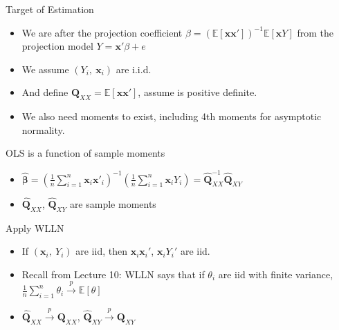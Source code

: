\documentclass[aspectratio=169, handout, t]{beamer}
\numberwithin{equation}{section}
\begin{document}

\begin{frame}{Target of Estimation}
\begin{itemize}
\item We are after the projection coefficient $\beta=(\mathbb{E}[\bm{x}\bm{x}'])^{-1}\mathbb{E}[\bm{x}Y]$ from the projection model $Y=\bm{x}'\beta+e$
\item We assume $(Y_i,\ \bm{x}_i)$ are i.i.d.
\item And define $\bm{Q}_{XX}=\mathbb{E}[\bm{x}\bm{x}']$, assume is positive definite.
\item We also need moments to exist, including 4th moments for asymptotic normality.
\end{itemize}
\end{frame}


\begin{frame}{OLS is a function of sample moments}
\begin{itemize}
\item $\hat{\bm{\beta}}=\left(\frac{1}{n}\sum_{i=1}^n\bm{x}_i\bm{x}'_i\right)^{-1}\left(\frac{1}{n}\sum_{i=1}^n\bm{x}_iY_i\right)=\hat{\bm{Q}}_{XX}^{-1}\hat{\bm{Q}}_{XY}$ \pause
\item $\hat{\bm{Q}}_{XX}$, $\hat{\bm{Q}}_{XY}$ are sample moments
\end{itemize}
\end{frame}


\begin{frame}{Apply WLLN}
\begin{itemize}
\item If $(\bm{x}_i,\ Y_i)$ are iid, then $\bm{x}_i\bm{x}_i'$, $\bm{x}_iY_i'$ are iid.\pause
\item Recall from Lecture 10: WLLN says that if $\theta_i$ are iid with finite variance, $\frac{1}{n} \sum_{i=1}^n \theta_i \overset{p}{\to} \mathbb{E}[\theta]$\pause
\item $\hat{\bm{Q}}_{XX} \overset{p}{\to} \bm{Q}_{XX}$, \quad $\hat{\bm{Q}}_{XY} \overset{p}{\to} \bm{Q}_{XY}$
\end{itemize}
\end{frame}

\end{document}
